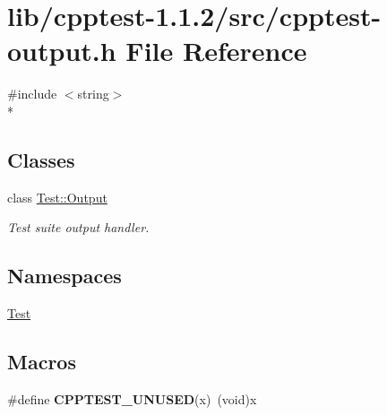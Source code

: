 \hypertarget{cpptest-output_8h}{}\section{lib/cpptest-\/1.1.2/src/cpptest-\/output.h File Reference}
\label{cpptest-output_8h}
{\ttfamily \#include $<$string$>$}\\*
\subsection*{Classes}
\begin{DoxyCompactItemize}
\item 
class \hyperlink{class_test_1_1_output}{Test\+::\+Output}
\begin{DoxyCompactList}\small\item\em Test suite output handler. \end{DoxyCompactList}\end{DoxyCompactItemize}
\subsection*{Namespaces}
\begin{DoxyCompactItemize}
\item 
 \hyperlink{namespace_test}{Test}
\end{DoxyCompactItemize}
\subsection*{Macros}
\begin{DoxyCompactItemize}
\item 
\#define {\bfseries C\+P\+P\+T\+E\+S\+T\+\_\+\+U\+N\+U\+S\+ED}(x)~(void)x\hypertarget{cpptest-output_8h_a2a7de828d9d74239d3e65d56797e3db0}{}\label{cpptest-output_8h_a2a7de828d9d74239d3e65d56797e3db0}

\end{DoxyCompactItemize}
